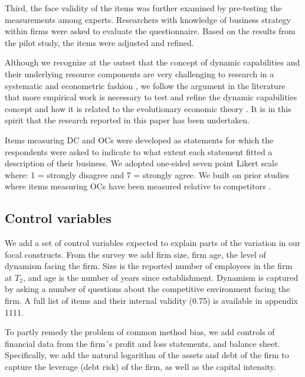 \documentclass[review,fleqn]{elsarticle}\usepackage[]{graphicx}\usepackage[]{color}
\makeatletter
\newenvironment{kframe}{%
 \def\at@end@of@kframe{}%
 \ifinner\ifhmode%
  \def\at@end@of@kframe{\end{minipage}}%
  \begin{minipage}{\columnwidth}%
 \fi\fi%
 \def\FrameCommand##1{\hskip\@totalleftmargin \hskip-\fboxsep
 \colorbox{shadecolor}{##1}\hskip-\fboxsep
     \hskip-\linewidth \hskip-\@totalleftmargin \hskip\columnwidth}%
 \MakeFramed {\advance\hsize-\width
   \@totalleftmargin\z@ \linewidth\hsize
   \@setminipage}}%
 {\par\unskip\endMakeFramed%
 \at@end@of@kframe}
\makeatother
\begin{document}
Third, the face validity of the items was further examined by pre-testing the measurements
among experts. Researchers with knowledge of business strategy within firms were asked to
evaluate the questionnaire. Based on the results from the pilot study, the items were
adjusted and refined.

Although we recognize at the outset that the concept of dynamic capabilities and their
underlying resource components are very challenging to research in a systematic and
econometric fashion \citep{McKelvie2009}, we follow the argument in the
literature that more empirical work is necessary to test and refine the dynamic
capabilities concept and how it is related to the evolutionary economic theory
\citep{Arend2009,McKelvie2009} .  It
is in this spirit that the research reported in this paper has been undertaken.

Items measuring DC and OCs were developed as statements for which the respondents were
asked to indicate to what extent each statement fitted a description of their business. We
adopted one-sided seven point Likert scale where: 1 = strongly disagree and 7 = strongly
agree. We built on prior studies where items measuring OCs have been measured relative to
competitors \citep{McKelvie2009}.


\begin{kframe}


{\ttfamily\noindent\bfseries\color{errorcolor}{\#\# Error in eval(expr, envir, enclos): object 'ht' not found}}\end{kframe}


\subsection{Control variables}

We add a set of control variables expected to explain parts of the variation in our focal
constructs. From the survey we add firm size, firm age, the level of dynamism facing the
firm. Size is the reported number of employees in the firm at $T_2$, and age is the number of
years since establishment. Dynamism is captured by asking a number of questions about the
competitive environment facing the firm. A full list of items and their internal validity
(0.75) is available in appendix 1111.

To partly remedy the problem of common method bias, we add controls of financial data from
the firm´s profit and loss statements, and balance sheet. Specifically, we add the natural
logarithm of the assets and debt of the firm to capture the leverage (debt risk) of the
firm, as well as the capital intensity.
\end{document}
